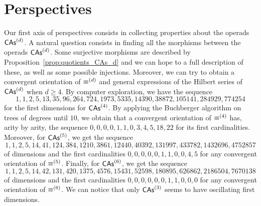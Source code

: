 \section*{Perspectives}


Our first axis of perspectives consists in collecting properties about
the operads $\mathsf{CAs}^{\left(d\right)}$. A natural question consists in finding all the
morphisms between the operads $\mathsf{CAs}^{\left(d\right)}$. Some surjective morphisms are
described by Proposition~\ref{prop:quotients_CAs_d} and we can hope to a
full description of these, as well as some possible injections.
Moreover, we can try to obtain a convergent orientation of
$\operatorname{\equiv}^{(d)}$ and general expressions of the Hilbert series of
$\mathsf{CAs}^{\left(d\right)}$ when $d \geq 4$. By computer exploration, we have the sequence
\begin{equation}
    1, 1, 2, 5, 13, 35, 96, 264, 724, 1973, 5335, 14390, 38872, 105141, 
    284929, 774254
\end{equation}
for the first dimensions for $\mathsf{CAs}^{\left(4\right)}$. By applying the Buchberger
algorithm on trees of degrees until $10$, we obtain that a convergent
orientation of $\operatorname{\equiv}^{(4)}$ has, arity by arity, the sequence
\begin{math}
    0, 0, 0, 0, 1, 1, 0, 3, 4, 5, 18, 22
\end{math}
for its first cardinalities. Moreover, for $\mathsf{CAs}^{\left(5\right)}$, we get the
sequence
\begin{equation}
1, 1, 2, 5, 14, 41, 124, 384, 1210, 3861, 12440, 40392, 131997, 
433782, 1432696, 4752857
\end{equation}
of dimensions and the first cardinalities
\begin{math}
    0, 0, 0, 0, 0, 1, 1, 0, 0, 4, 5
\end{math}
for any convergent orientation of $\operatorname{\equiv}^{(5)}$. Finally, for
$\mathsf{CAs}^{\left(6\right)}$, we get the sequence
\begin{equation}
   1, 1, 2, 5, 14, 42, 131, 420, 1375, 4576, 15431, 52598, 
   180895, 626862, 2186504, 7670138
\end{equation}
of dimensions and the first cardinalities
\begin{math}
    0, 0, 0, 0, 0, 0, 1, 1, 0, 0, 0
\end{math}
for any convergent orientation of $\operatorname{\equiv}^{(6)}$. We can notice that
only $\mathsf{CAs}^{\left(3\right)}$ seems to have oscillating first dimensions.
\medbreak

